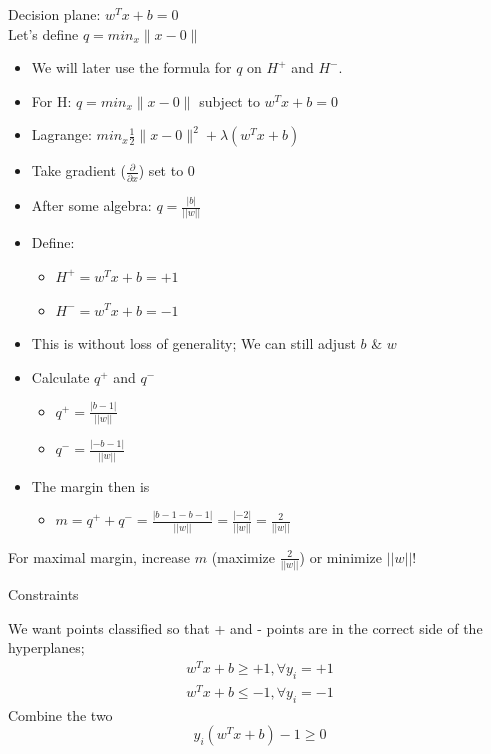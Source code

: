 \documentclass[12pt,fleqn]{article}
\begin{document}
Decision plane: $w^{T}x + b=0$ \\
Let's define $q = min_{x}\big\|x - 0\big\|$

\begin{itemize}
   \item We will later use the formula for $q$ on $H^{+}$ and $H^{-}$.
   \item For H: $q = min_{x}\big\|x - 0\big\|$ subject to $w^{T}x+b=0$
   \item Lagrange: $min_{x}\frac{1}{2}\big\|x - 0\big\|^2+\lambda(w^{T}x+b)$
   \item Take gradient ($\frac{\partial}{\partial x}$) set to 0
   \item After some algebra: $q = \frac{|b|}{||w||}$
\end{itemize}


\begin{itemize}
  \item Define:
  \begin{itemize}  
  \item $H^{+} = w^{T}x + b=+1$
  \item $H^{-} = w^{T}x + b=-1$
  \end{itemize}
  \item This is without loss of generality; We can still adjust $b$ \& $w$
\end{itemize}

\begin{itemize}
  \item Calculate $q^{+}$ and $q^{-}$
  \begin{itemize}
  \item $q^{+} = \frac{|b-1|}{||w||}$
  \item $q^{-} = \frac{|-b-1|}{||w||}$
  \end{itemize}
  \item The margin then is 
  \begin{itemize}
  \item $m=q^{+}+q^{-} = \frac{|b-1-b-1|}{||w||} = \frac{|-2|}{||w||} = \frac{2}{||w||}$
  \end{itemize}  
\end{itemize}

For maximal margin, increase $m$ (maximize $\frac{2}{||w||}$) or minimize
$||w||$!

Constraints

We want points classified so that + and - points are in the correct side of the
hyperplanes;
\begin{eqnarray*}
w^{T}x+b \geq +1, \forall y_{i}=+1  \nonumber \\
w^{T}x+b \leq -1, \forall y_{i}=-1 \nonumber
\end{eqnarray*}
Combine the two
\begin{equation}
y_{i}(w^{T}x+b)-1 \geq 0 \nonumber
\end{equation}
\end{document}
